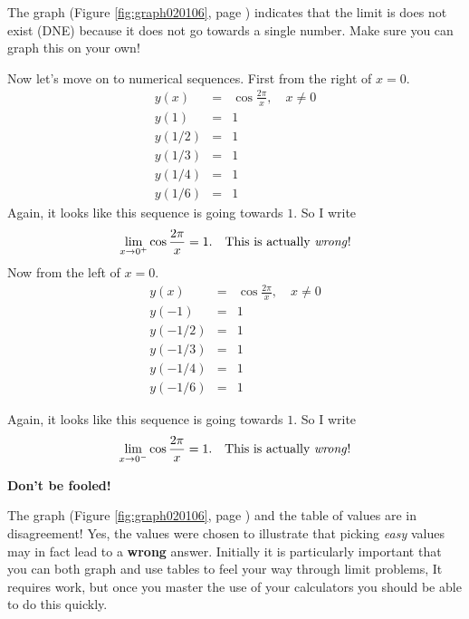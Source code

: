 \documentclass[12pt,addpoints, answers, fleqn]{exam}
\begin{document}
\begin{questions}
\begin{solution}
The graph (Figure \ref{fig:graph020106}, page \pageref{fig:graph020106}) indicates that the limit is does not exist (DNE) because it does not go towards a single number. Make sure you can graph this on your own!

Now let's move on to numerical sequences. First from the right of $x=0$.
\begin{eqnarray*}
y\left( x \right) &=& \cos \frac{2 \pi}{x}, \quad x \neq 0\\
y\left( 1 \right) &=& 1\\
y\left( 1/2 \right) &=& 1\\
y\left( 1/3 \right) &=& 1\\
y\left( 1/4 \right) &=&1\\
y\left( 1/6 \right) &=&1
\end{eqnarray*}
Again, it looks like this sequence is going towards $1$. So I write
\[
\mathop {\lim }\limits_{x \to 0^+ }  \cos \frac{2 \pi}{x}  = 1.\quad \mbox{This is actually \emph{wrong}!}
\]
Now from the left of $x=0$.
\begin{eqnarray*}
y\left( x \right) &=& \cos \frac{2 \pi}{x}, \quad x \neq 0\\
y\left( -1 \right) &=& 1\\
y\left( -1/2 \right) &=& 1\\
y\left( -1/3 \right) &=& 1\\
y\left( -1/4 \right) &=&1 \\
y\left( -1/6 \right) &=&1
\end{eqnarray*}



Again, it looks like this sequence is going towards $1$. So I write
\[
\mathop {\lim }\limits_{x \to 0^- }  \cos \frac{2 \pi}{x} = 1. \quad \mbox{This is actually \emph{wrong}!}
\]


\begin{center}
\textbf{Don't be fooled!}
\end{center}


The graph (Figure \ref{fig:graph020106}, page \pageref{fig:graph020106})  and the table of values are in disagreement! Yes, the values were chosen to illustrate that picking \emph{easy} values may in fact lead to a \textbf{wrong} answer. Initially it is particularly important that you can both graph and use tables to feel your way through limit problems, It requires work, but once you master the use of your calculators you should be able to do this quickly.




\end{solution}
\end{questions}
\end{document}

